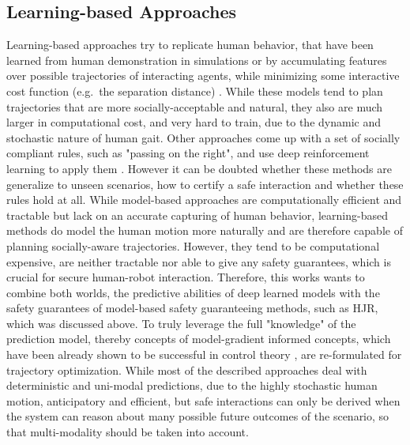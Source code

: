 \subsection{Learning-based Approaches}
Learning-based approaches try to replicate human behavior, that have been learned from human demonstration in simulations or by accumulating features over possible trajectories of interacting agents, while minimizing some interactive cost function (e.g.\ the separation distance) \cite{Kim2016}\cite{Kretzschmar2016}. While these models tend to plan trajectories that are more socially-acceptable and natural, they also are much larger in computational cost, and very hard to train, due to the dynamic and stochastic nature of human gait. Other approaches come up with a set of socially compliant rules, such as "passing on the right", and use deep reinforcement learning to apply them  \cite{Knepper2012}\cite{Chen2017}\cite{Everett2018}. However it can be doubted whether these methods are generalize to unseen scenarios, how to certify a safe interaction and whether these rules hold at all.
\newline\newline
While model-based approaches are computationally efficient and tractable but lack on an accurate capturing of human behavior, learning-based methods do model the human motion more naturally and are therefore capable of planning socially-aware trajectories. However, they tend to be computational expensive, are neither tractable nor able to give any safety guarantees, which is crucial for secure human-robot interaction. Therefore, this works wants to combine both worlds, the predictive abilities of deep learned models with the safety guarantees of model-based safety guaranteeing methods, such as \ac{HJR}, which was discussed above. To truly leverage the full "knowledge" of the prediction model, thereby concepts of model-gradient informed concepts, which have been already shown to be successful in control theory \cite{Chen2019}\cite{Fan2020}, are re-formulated for trajectory optimization. While most of the described approaches deal with deterministic and uni-modal predictions, due to the highly stochastic human motion,  anticipatory and efficient, but safe interactions can only be derived when the system can reason about many possible future outcomes of the scenario, so that multi-modality should be taken into account.


